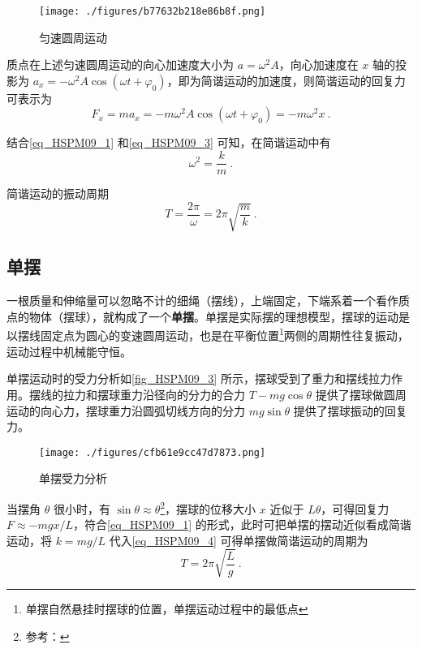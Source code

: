 \begin{figure}[ht]
\centering
\texttt{[image: ./figures/b77632b218e86b8f.png]}
\caption{匀速圆周运动} \label{fig_HSPM09_4}
\end{figure}

质点在上述匀速圆周运动的向心加速度大小为 $a=\omega^2 A$，向心加速度在 $x$ 轴的投影为 $a_x=-\omega^2 A\cos(\omega t + \varphi_0)$，即为简谐运动的加速度，则简谐运动的回复力可表示为
\begin{equation}\label{eq_HSPM09_3}
F_x=ma_x=-m\omega^2 A\cos(\omega t + \varphi_0)= -m\omega^2 x~.
\end{equation}

结合\autoref{eq_HSPM09_1} 和\autoref{eq_HSPM09_3} 可知，在简谐运动中有
\begin{equation}
\omega^2=\frac km~.
\end{equation}

简谐运动的振动周期
\begin{equation}\label{eq_HSPM09_4}
T=\frac {2\pi}{\omega}=2\pi\sqrt{\frac mk}~.
\end{equation}


\subsection{单摆}

一根质量和伸缩量可以忽略不计的细绳（摆线），上端固定，下端系着一个看作质点的物体（摆球），就构成了一个\textbf{单摆}。单摆是实际摆的理想模型，摆球的运动是以摆线固定点为圆心的变速圆周运动，也是在平衡位置\footnote{单摆自然悬挂时摆球的位置，单摆运动过程中的最低点}两侧的周期性往复振动，运动过程中机械能守恒。

单摆运动时的受力分析如\autoref{fig_HSPM09_3} 所示，摆球受到了重力和摆线拉力作用。摆线的拉力和摆球重力沿径向的分力的合力 $T-mg\cos\theta$ 提供了摆球做圆周运动的向心力，摆球重力沿圆弧切线方向的分力 $mg\sin\theta$ 提供了摆球振动的回复力。

\begin{figure}[ht]
\centering
\texttt{[image: ./figures/cfb61e9cc47d7873.png]}
\caption{单摆受力分析} \label{fig_HSPM09_3}
\end{figure}

当摆角 $\theta$ 很小时，有 $\sin\theta \approx \theta$\footnote{参考：}，摆球的位移大小 $x$ 近似于 $L\theta$，可得回复力 $F \approx -mgx/L$，符合\autoref{eq_HSPM09_1} 的形式，此时可把单摆的摆动近似看成简谐运动，将 $k=mg/L$ 代入\autoref{eq_HSPM09_4} 可得单摆做简谐运动的周期为
\begin{equation}
T=2\pi\sqrt{\frac Lg}~.
\end{equation}

